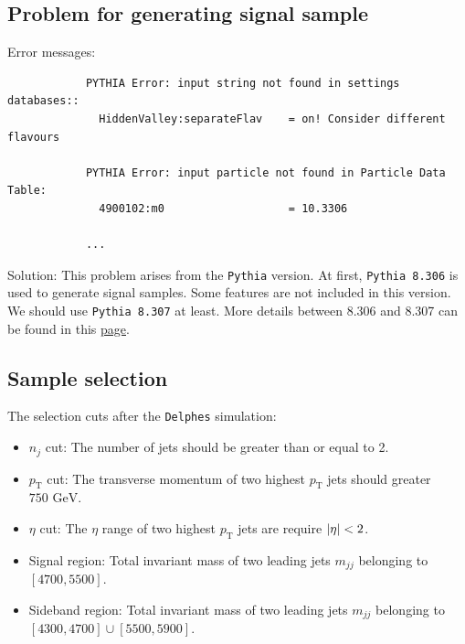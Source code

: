 \documentclass[12pt]{article}
\begin{document}
    \subsection{Problem for generating signal sample}%
    \label{sub:problem_for_generating_signal_sample}
        Error messages:
        \begin{verbatim}
            PYTHIA Error: input string not found in settings databases::
              HiddenValley:separateFlav    = on! Consider different flavours

            PYTHIA Error: input particle not found in Particle Data Table:
              4900102:m0                   = 10.3306

            ...
        \end{verbatim}

        Solution: This problem arises from the \verb|Pythia| version. At first, \verb|Pythia 8.306| is used to generate signal samples. Some features are not included in this version. We should use \verb|Pythia 8.307| at least. More details between 8.306 and 8.307 can be found in this \href{https://pythia.org/history/}{page}.
    \subsection{Sample selection}%
    \label{sub:sample_selection}
        The selection cuts after the \verb|Delphes| simulation:
        \begin{itemize}
            \item $n_j$ cut: The number of jets should be greater than or equal to 2.
            \item $p_{\text{T}}$ cut: The transverse momentum of two highest $p_{\text{T}}$ jets should greater $\text{750 GeV}$.
            \item $\eta$ cut: The $\eta$ range of two highest  $p_{\text{T}}$ jets are require $\abs{\eta} < 2$.
            \item Signal region: Total invariant mass of two leading jets $m_{jj}$ belonging to $[4700,5500]$.
            \item Sideband region: Total invariant mass of two leading jets $m_{jj}$ belonging to $[4300,4700] \cup [5500,5900]$.
        \end{itemize}
\end{document}
